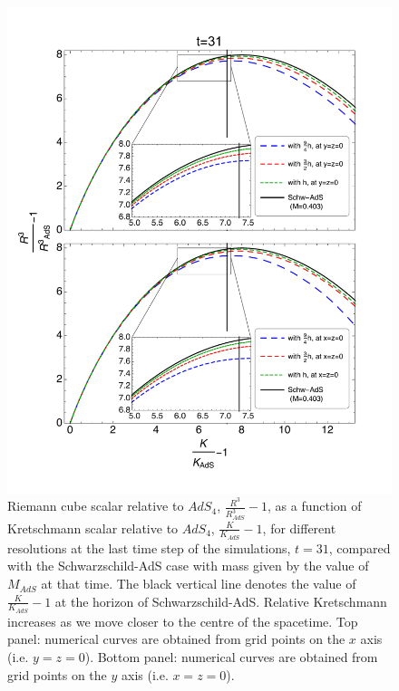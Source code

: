 \documentclass[a4paper,11pt]{article}
\begin{document}
\begin{figure}[!h]
        \centering
        \includegraphics[width=5.5in,clip=true]{plots/bulkplots/compare_res/relriemanncube-relkretsch/combined_withzoom_fullplotrelRieCubeofrelkretschallres.pdf}
\parbox{5.0in}{\caption{Riemann cube scalar relative to $AdS_4$, $\frac{R^3}{R^3_{AdS}}-1$, as a function of Kretschmann scalar relative to $AdS_4$, $\frac{K}{K_{AdS}}-1$, for different resolutions at the last time step of the simulations, $t=31$, compared with the Schwarzschild-AdS case with mass given by the value of $M_{AdS}$ at that time. The black vertical line denotes the value of $\frac{K}{K_{AdS}}-1$ at the horizon of Schwarzschild-AdS. Relative Kretschmann increases as we move closer to the centre of the spacetime. Top panel: numerical curves are obtained from grid points on the $x$ axis (i.e. $y=z=0$). Bottom panel: numerical curves are obtained from grid points on the $y$ axis (i.e. $x=z=0$).
        }\label{fig:relRiemanncube-relKretschmann-comparison-SchwAdS}}
\end{figure}
\end{document}
